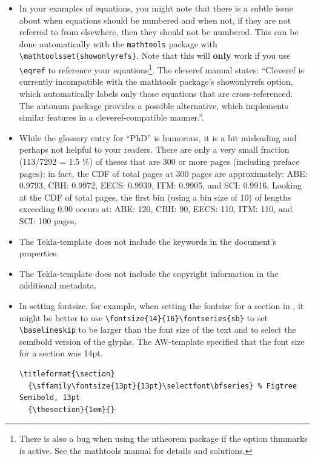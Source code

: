 \documentclass[12pt, twoside]{article}
\begin{document}
\begin{itemize}[label=\color{red}]
\item In your examples of equations, you might note that there is a subtle issue about when equations should be numbered and when not, \ie if they are not referred to from elsewhere, then they should not be numbered. This can be done automatically with the \texttt{mathtools} package with
\texttt{\textbackslash mathtoolsset\{showonlyrefs\}}. Note that this will \textbf{only} work if you use \texttt{\textbackslash eqref} to reference your equations\footnote{There is also a bug when using the ntheorem package if the option thmmarks is active. See the mathtools manual for details and solutions.}. The cleveref manual states: ``Cleveref is currently incompatible with the mathtools package’s showonlyrefs option, which automatically labels only those equations that are cross-referenced. The autonum package provides a possible alternative, which implements similar features in a cleveref-compatible manner.''.


  \item While the glossary entry for ``PhD'' is humorous, it is a bit misleading and perhaps not helpful to your readers. There are only a very small fraction (113/7292 = 1.5 \%) of theses that are 300 or more pages (including preface pages); in fact, the CDF of total pages at 300 pages are approximately:
  ABE:	0.9793,
CBH:	0.9972,
EECS:	0.9939,
ITM:	0.9905, and
SCI:	0.9916. Looking at the CDF of total pages, the first bin (using a bin size of 10) of lengths exceeding 0.90 occurs at: ABE: 120, CBH: 90, EECS: 110, ITM: 110, and SCI: 100 pages.


\item The Tekla-template does not include the keywords in the document's properties.

\item The Tekla-template does not include the copyright information in the additional metadata.

\item In setting fontsize, for example, when setting the fontsize for a section in , 
it might be better to use \texttt{\textbackslash fontsize\{14\}\{16\}\textbackslash fontseries\{sb\}} to set \texttt{\textbackslash baselineskip} to be larger than the font size of the text and to select the semibold version of the glyphs. The AW-template specified that the font size for a section was 14pt.

\begin{lstlisting}[style=latexExample, caption={Setting font for section hadings}, columns=fullflexible, showstringspaces=false, label=lst:sectionHeadingFont]
\titleformat{\section}
  {\sffamily\fontsize{13pt}{13pt}\selectfont\bfseries} % Figtree Semibold, 13pt
  {\thesection}{1em}{}
\end{lstlisting}


\end{itemize}
\end{document}
